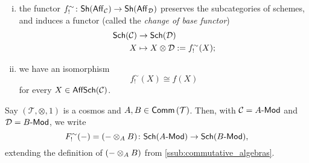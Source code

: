 \begin{theorem}
\begin{enumerate}[(i)]
            \item the functor $f_!^\sim\colon\mathsf{Sh}(\mathsf{Aff}_{\mathcal{C}})\to\mathsf{Sh}(\mathsf{Aff}_{\mathcal{D}})$ preserves the subcategories of schemes, and induces a functor (called the \emph{change of base functor})
                \begin{align*}
                    \mathsf{Sch}(\mathcal{C})&\to\mathsf{Sch}(\mathcal{D})\\
                    X&\mapsto X\otimes\mathcal{D} := f_!^\sim(X);
                \end{align*}
            \item we have an isomorphism
                \begin{equation*}
                    f_!^\sim(X)\cong f(X)
                \end{equation*}
                for every $X\in\mathsf{AffSch}(\mathcal{C})$.\qedhere
        \end{enumerate}
    \end{theorem}


    \begin{note}[Notation]
        Say $(\mathcal{T},\otimes,1)$ is a cosmos and $A,B\in\mathsf{Comm}\left({\mathcal{T}}\right)$.
        Then, with $\mathcal{C}={{A}\hbox{-}\mathsf{Mod}}$ and $\mathcal{D}={{B}\hbox{-}\mathsf{Mod}}$, we write
        \begin{equation*}
            F_!^\sim({-})=({-}\otimes_A B)\colon\mathsf{Sch}({{A}\hbox{-}\mathsf{Mod}})\to\mathsf{Sch}({{B}\hbox{-}\mathsf{Mod}}),
        \end{equation*}
        extending the definition of $({-}\otimes_A B)$ from \cref{ssub:commutative_algebras}.
    \end{note}


